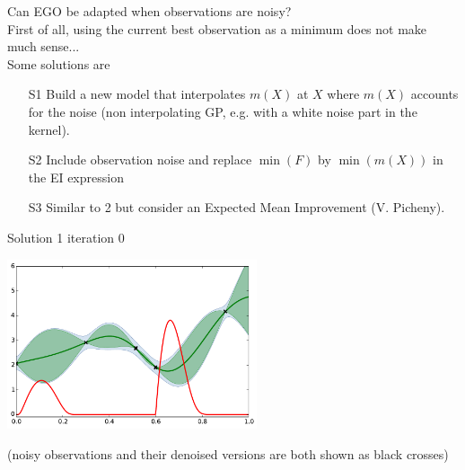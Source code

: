\documentclass{beamer}
\begin{document}

\begin{frame}{}
Can EGO be adapted when observations are noisy?\\
\vspace{5mm}
First of all, using the current best observation as a minimum does not make much sense...\\
\vspace{5mm}
Some solutions are
\begin{itemize}
	\item[S1] Build a new model that interpolates $m(X)$ at $X$ where $m(X)$ accounts for the noise (non interpolating GP, e.g. with a white noise part in the kernel).
	\item[S2] Include observation noise and replace $\min(F)$ by $\min(m(X))$ in the EI expression
	\item[S3] Similar to 2 but consider an Expected Mean Improvement (V. Picheny).
\end{itemize}
\end{frame}

\begin{frame}{Solution 1}
iteration 0
\begin{center}
\includegraphics[height=5cm]{figures/python/ego_EI1n0}
\end{center}
\tiny (noisy observations and their denoised versions are both shown as black crosses)\\
\end{frame}
\end{document}
